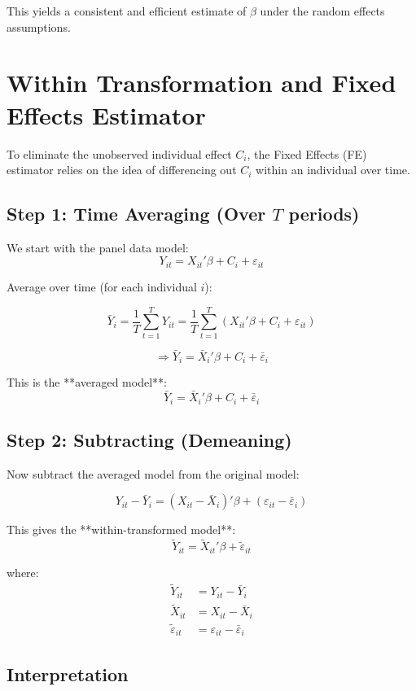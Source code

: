 \documentclass[12pt, oneside]{article}
\begin{document}
This yields a consistent and efficient estimate of \( \beta \) under the random effects assumptions.

\section*{Within Transformation and Fixed Effects Estimator}

To eliminate the unobserved individual effect \( C_i \), the Fixed Effects (FE) estimator relies on the idea of differencing out \( C_i \) within an individual over time.

\subsection*{Step 1: Time Averaging (Over \( T \) periods)}

We start with the panel data model:
\[
Y_{it} = X_{it}'\beta + C_i + \varepsilon_{it}
\]

Average over time (for each individual \( i \)):

\[
\bar{Y}_i = \frac{1}{T} \sum_{t=1}^T Y_{it} = \frac{1}{T} \sum_{t=1}^T \left( X_{it}' \beta + C_i + \varepsilon_{it} \right)
\]

\[
\Rightarrow \bar{Y}_i = \bar{X}_i' \beta + C_i + \bar{\varepsilon}_i
\]

This is the **averaged model**:
\[
\bar{Y}_i = \bar{X}_i' \beta + C_i + \bar{\varepsilon}_i \tag{1.2}
\]

\subsection*{Step 2: Subtracting (Demeaning)}

Now subtract the averaged model from the original model:

\[
Y_{it} - \bar{Y}_i = (X_{it} - \bar{X}_i)'\beta + (\varepsilon_{it} - \bar{\varepsilon}_i)
\]

This gives the **within-transformed model**:
\[
\tilde{Y}_{it} = \tilde{X}_{it}' \beta + \tilde{\varepsilon}_{it} \tag{1.3}
\]

where:
\begin{align*}
\tilde{Y}_{it} &= Y_{it} - \bar{Y}_i \\
\tilde{X}_{it} &= X_{it} - \bar{X}_i \\
\tilde{\varepsilon}_{it} &= \varepsilon_{it} - \bar{\varepsilon}_i
\end{align*}

\subsection*{Interpretation}
\end{document}
